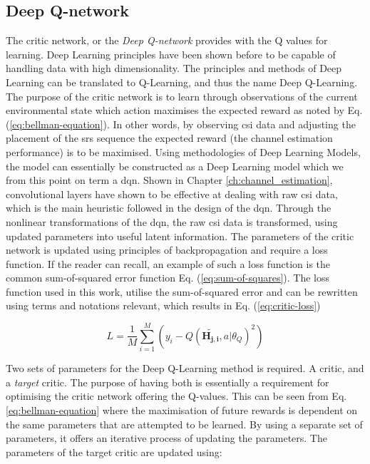 \subsection{Deep Q-network}
The critic network, or the \emph{Deep Q-network} provides with the Q values for learning. Deep Learning principles have been shown before to be capable of handling data with high dimensionality. The principles and methods of Deep Learning can be translated to Q-Learning, and thus the name Deep Q-Learning. The purpose of the critic network is to learn through observations of the current environmental state which action maximises the expected reward as noted by Eq. (\ref{eq:bellman-equation}). In other words, by observing \gls{csi} data and adjusting the placement of the \gls{srs} sequence the expected reward (the channel estimation performance) is to be maximised. Using methodologies of Deep Learning Models, the model can essentially be constructed as a Deep Learning model which we from this point on term a \gls{dqn}. Shown in Chapter \ref{ch:channel_estimation}, convolutional layers have shown to be effective at dealing with raw \gls{csi} data, which is the main heuristic followed in the design of the \gls{dqn}. Through the nonlinear transformations of the \gls{dqn}, the raw \gls{csi} data is transformed, using updated parameters into useful latent information. The parameters of the critic network is updated using principles of backpropagation and require a loss function. If the reader can recall, an example of such a loss function is the common sum-of-squared error function Eq. (\ref{eq:sum-of-squares}). The loss function used in this work, utilise the sum-of-squared error and can be rewritten using terms and notations relevant, which results in Eq. (\ref{eq:critic-loss})

\begin{equation}\label{eq:critic-loss}
     L = \frac{1}{M} \sum_{i=1}^M(y_i - Q(\mathbf{\widetilde{H_{j,i}}}, a| \theta_Q)^2)
\end{equation}

\noindent Two sets of parameters for the Deep Q-Learning method is required. A critic, and a \emph{target} critic. The purpose of having both is essentially a requirement for optimising the critic network offering the Q-values. This can be seen from Eq. \ref{eq:bellman-equation} where the maximisation of future rewards is dependent on the same parameters that are attempted to be learned. By using a separate set of parameters, it offers an iterative process of updating the parameters. The parameters of the target critic are updated using:


